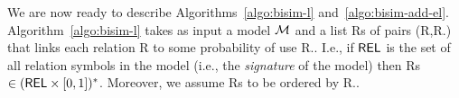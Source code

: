 

We are now ready to describe Algorithms~\ref{algo:bisim-l}
and~\ref{algo:bisim-add-el}. Algorithm~\ref{algo:bisim-l} takes as
input a model $\mathcal{M}$ and a list Rs of pairs (R,R.\puse) that links each
relation R to some probability of use R.\puse. I.e., if $\textsf{REL}$ is the
set of all relation symbols in the model (i.e., the \emph{signature}
of the model) then Rs $\in (\textsf{REL} \times [0,1])^*$. Moreover, we assume
Rs to be ordered by R.\puse.




